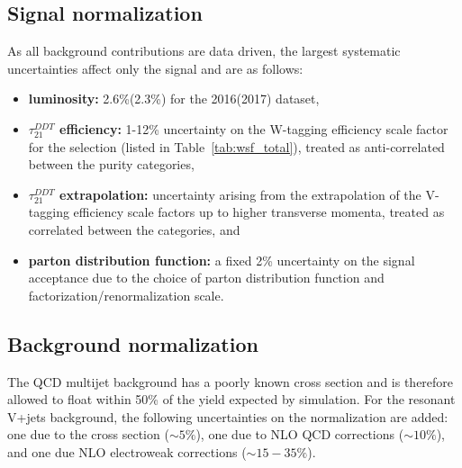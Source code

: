 \subsection{Signal normalization}
As all background contributions are data driven, the largest systematic uncertainties affect only the signal and are as follows:
\begin{itemize}
  \itemsep0em
\item {\bf luminosity: } 2.6\%(2.3\%) for the 2016(2017) dataset,
\item {\bf $\tau_{21}^{DDT}$ efficiency: } 1-12\% uncertainty on the W-tagging efficiency scale factor for the \ddt selection (listed in Table~\ref{tab:wsf_total}), treated as anti-correlated between the purity categories,
\item {\bf $\tau_{21}^{DDT}$ \PT{} extrapolation: } uncertainty arising from the extrapolation of the V-tagging efficiency scale factors up to higher transverse momenta, treated as correlated between the \ddt categories, and 
\item {\bf parton distribution function: } a fixed 2\% uncertainty on the signal acceptance due to the choice of parton distribution function and factorization/renormalization scale. 
\end{itemize} 


\subsection{Background normalization}
The QCD multijet background has a poorly known cross section and is therefore allowed to float within 50\% of the yield expected by simulation. For the resonant V+jets background, the following uncertainties on the normalization are added: one due to the cross section ($\sim5\%$), one due to NLO QCD corrections ($\sim10\%$), and one due NLO electroweak corrections ($\sim15-35\%$).

